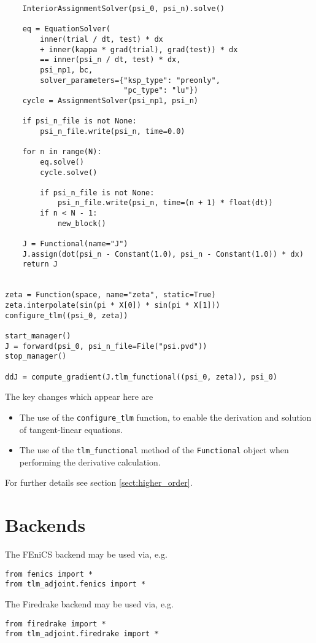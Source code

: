 \documentclass[11pt]{article}
\begin{document}
\begin{lstlisting}
    InteriorAssignmentSolver(psi_0, psi_n).solve()

    eq = EquationSolver(
        inner(trial / dt, test) * dx
        + inner(kappa * grad(trial), grad(test)) * dx
        == inner(psi_n / dt, test) * dx,
        psi_np1, bc,
        solver_parameters={"ksp_type": "preonly",
                           "pc_type": "lu"})
    cycle = AssignmentSolver(psi_np1, psi_n)

    if psi_n_file is not None:
        psi_n_file.write(psi_n, time=0.0)

    for n in range(N):
        eq.solve()
        cycle.solve()

        if psi_n_file is not None:
            psi_n_file.write(psi_n, time=(n + 1) * float(dt))
        if n < N - 1:
            new_block()

    J = Functional(name="J")
    J.assign(dot(psi_n - Constant(1.0), psi_n - Constant(1.0)) * dx)
    return J


zeta = Function(space, name="zeta", static=True)
zeta.interpolate(sin(pi * X[0]) * sin(pi * X[1]))
configure_tlm((psi_0, zeta))

start_manager()
J = forward(psi_0, psi_n_file=File("psi.pvd"))
stop_manager()

ddJ = compute_gradient(J.tlm_functional((psi_0, zeta)), psi_0)
\end{lstlisting}

The key changes which appear here are
\begin{itemize}
  \item The use of the \texttt{configure\_tlm} function, to enable the
    derivation and solution of tangent-linear equations. 
  \item The use of the \texttt{tlm\_functional} method of the
    \texttt{Functional} object when performing the derivative calculation.
\end{itemize}
For further details see section \ref{sect:higher_order}.

\section{Backends}\label{sect:backends}

The FEniCS backend may be used via, e.g.
\begin{lstlisting}
from fenics import *
from tlm_adjoint.fenics import *
\end{lstlisting}

The Firedrake backend may be used via, e.g.
\begin{lstlisting}
from firedrake import *
from tlm_adjoint.firedrake import *
\end{lstlisting}
\end{document}
